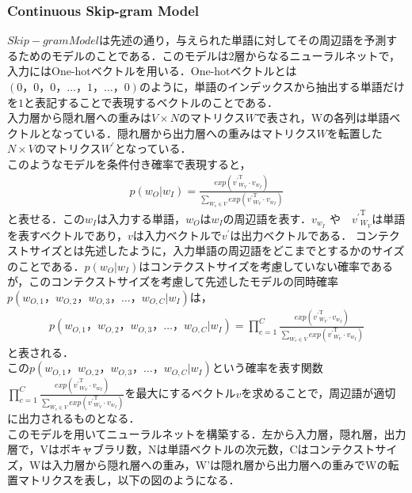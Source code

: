 \subsubsection{Continuous Skip-gram Model}
\label{tech:skipgram}
$ Skip-gram Model $は先述の通り，与えられた単語に対してその周辺語を予測するためのモデルのことである．このモデルは2層からなるニューラルネットで，入力にはOne-hotベクトルを用いる．One-hotベクトルとは$ (0，0，0， \ldots ，1， \ldots ，0) $のように，単語のインデックスから抽出する単語だけを$ 1 $と表記することで表現するベクトルのことである．\\
入力層から隠れ層への重みは$ V \times N $のマトリクス$ W $で表され，Wの各列は単語ベクトルとなっている．隠れ層から出力層への重みはマトリクス$ W $を転置した$ N \times V $のマトリクス$ W^{\prime} $となっている．\\
このようなモデルを条件付き確率で表現すると，
\begin{align}
p(w_{O}|w_{I}) = \frac{exp({{v^{\prime}}^{\mathrm{T}}_{W_{V}}} \cdot v_{w_{I}})}{\sum_{W_{v} \in{V}}exp({{v^{\prime}}^{\mathrm{T}}_{W_{V}}} \cdot v_{w_{I}})} \nonumber
\end{align}
と表せる．この$ w_{I} $は入力する単語，$ w_{O} $は$ w_{I} $の周辺語を表す．$ v_{w_{I}} $ や　$ {v^{\prime}}^{\mathrm{T}}_{W_{V}} $は単語を表すベクトルであり，$ v $は入力ベクトルで$ v^{\prime} $は出力ベクトルである．
コンテクストサイズとは先述したように，入力単語の周辺語をどこまでとするかのサイズのことである．$ p(w_{O}|w_{I}) $はコンテクストサイズを考慮していない確率であるが，このコンテクストサイズを考慮して先述したモデルの同時確率$ p(w_{O,1}，w_{O,2}，w_{O,3}， \ldots ，w_{O,C}|w_{I}) $は，
\begin{align}
p(w_{O,1}，w_{O,2}，w_{O,3}， \ldots ，w_{O,C}|w_{I}) = \prod_{c=1}^{C} \frac{exp({{v^{\prime}}^{\mathrm{T}}_{W_{V}}} \cdot v_{w_{I}})}{\sum_{W_{v} \in{V}}exp({{v^{\prime}}^{\mathrm{T}}_{W_{V}}} \cdot v_{w_{I}})} \nonumber
\end{align}
と表される．\\
この$ p(w_{O,1}，w_{O,2}，w_{O,3}， \ldots ，w_{O,C}|w_{I}) $という確率を表す関数$ \prod_{c=1}^{C} \frac{exp({{v^{\prime}}^{\mathrm{T}}_{W_{V}}} \cdot v_{w_{I}})}{\sum_{W_{v} \in{V}}exp({{v^{\prime}}^{\mathrm{T}}_{W_{V}}} \cdot v_{w_{I}})} $を最大にするベクトル$ v $を求めることで，周辺語が適切に出力されるものとなる．\\
このモデルを用いてニューラルネットを構築する．左から入力層，隠れ層，出力層で，Vはボキャブラリ数，Nは単語ベクトルの次元数，Cはコンテクストサイズ，Wは入力層から隠れ層への重み，W'は隠れ層から出力層への重みでWの転置マトリクスを表し，以下の図のようになる．\\
